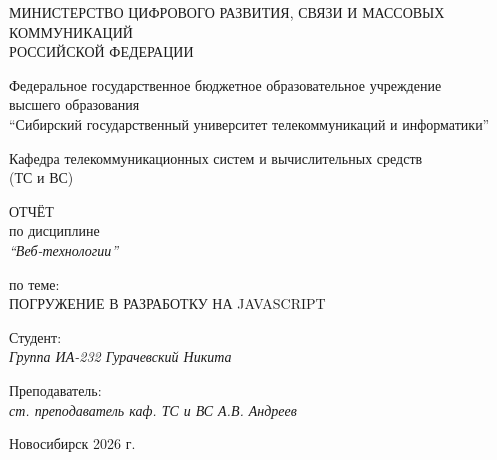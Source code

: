 \thispagestyle{empty}

\begin{center}
    МИНИСТЕРСТВО ЦИФРОВОГО РАЗВИТИЯ, СВЯЗИ И МАССОВЫХ КОММУНИКАЦИЙ \\ РОССИЙСКОЙ ФЕДЕРАЦИИ

    \vspace{20pt}

    Федеральное государственное бюджетное образовательное учреждение \\ высшего образования \\
    ``Сибирский государственный университет телекоммуникаций и информатики''

    \vspace{20pt}

    Кафедра телекоммуникационных систем и вычислительных средств \\ (ТС и ВС)
\end{center}

\vfill

\begin{center}
    ОТЧЁТ \\
    по дисциплине \\
    \textit{``Веб-технологии''}

    \vspace{20pt}

    по теме: \\
    \MakeUppercase{Погружение в разработку на JavaScript}
\end{center}

\vfill

\noindent Студент: \\
\textit{Группа ИА-232 \hfill Гурачевский Никита}

\vspace{20pt}

\noindent Преподаватель: \\
\textit{ст. преподаватель каф. ТС и ВС \hfill А.В. Андреев}

\vfill
\begin{center}
    Новосибирск 2026 г.
\end{center}
